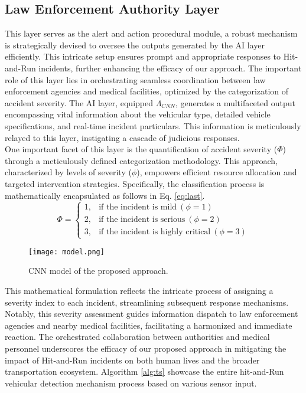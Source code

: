\documentclass[10pt, conference, a4paper, compsocconf]{IEEEtran}
\begin{document}
\subsection{Law Enforcement Authority Layer}
This layer serves as the alert and action procedural module, a robust mechanism is strategically devised to oversee the outputs generated by the AI layer efficiently. This intricate setup ensures prompt and appropriate responses to Hit-and-Run incidents, further enhancing the efficacy of our approach. The important role of this layer lies in orchestrating seamless coordination between law enforcement agencies and medical facilities, optimized by the categorization of accident severity. The AI layer, equipped $\Lambda_{CNN}$, generates a multifaceted output encompassing vital information about the vehicular type, detailed vehicle specifications, and real-time incident particulars. This information is meticulously relayed to this layer, instigating a cascade of judicious responses.\\
\indent One important facet of this layer is the quantification of accident severity ($\Phi$) through a meticulously defined categorization methodology. This approach, characterized by levels of severity ($\phi$), empowers efficient resource allocation and targeted intervention strategies. Specifically, the classification process is mathematically encapsulated as follows in Eq. \ref{eq:last}.
\begin{equation}\label{eq:last}
\Phi = \begin{cases}
1, & \text{if the incident is mild} \ (\phi = 1) \\
2, & \text{if the incident is serious} \ (\phi = 2) \\
3, & \text{if the incident is highly critical} \ (\phi = 3)
\end{cases}
\end{equation}
\begin{figure}[h!]
	\centering
	\texttt{[image: model.png]}
	\caption{CNN model of the proposed approach.}
	\label{fig:2}
\end{figure}
This mathematical formulation reflects the intricate process of assigning a severity index to each incident, streamlining subsequent response mechanisms. Notably, this severity assessment guides information dispatch to law enforcement agencies and nearby medical facilities, facilitating a harmonized and immediate reaction. The orchestrated collaboration between authorities and medical personnel underscores the efficacy of our proposed approach in mitigating the impact of Hit-and-Run incidents on both human lives and the broader transportation ecosystem. Algorithm \ref{alg:ts} showcase the entire hit-and-Run vehicular detection mechanism process based on various sensor input. 
\end{document}
